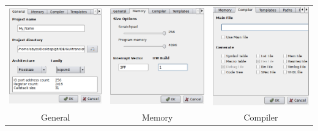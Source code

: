    \begin{table}[h!]
        \begin{tabular}{ccc}
            \includegraphics[width=.33\textwidth]{img/project_1.png}
                &
            \includegraphics[width=.33\textwidth]{img/project_2.png}
                &
            \includegraphics[width=.33\textwidth]{img/project_3.png}
                \\
            General & Memory & Compiler
        \end{tabular}
    \end{table}


